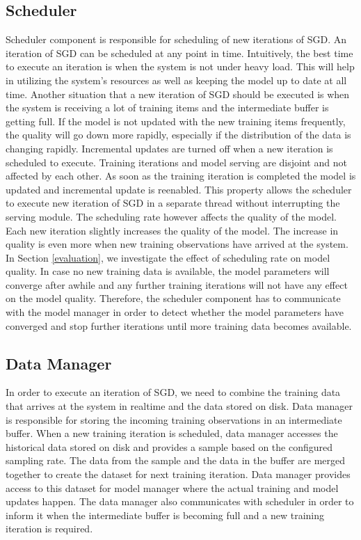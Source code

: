 \documentclass{sig-alternate-05-2015}
\begin{document}
\subsection{Scheduler}\label{scheduler}
Scheduler component is responsible for scheduling of new iterations of SGD.
An iteration of SGD can be scheduled at any point in time.
Intuitively, the best time to execute an iteration is when the system is not under heavy load.
This will help in utilizing the system's resources as well as keeping the model up to date at all time.
Another situation that a new iteration of SGD should be executed is when the system is receiving a lot of training items and the intermediate buffer is getting full.
If the model is not updated with the new training items frequently, the quality will go down more rapidly, especially if the distribution of the data is changing rapidly.
Incremental updates are turned off when a new iteration is scheduled to execute.
Training iterations and model serving are disjoint and not affected by each other.
As soon as the training iteration is completed the model is updated and incremental update is reenabled. 
This property allows the scheduler to execute new iteration of SGD in a separate thread without interrupting the serving module.
The scheduling rate however affects the quality of the model.
Each new iteration slightly increases the quality of the model.
The increase in quality is even more when new training observations have arrived at the system.
In Section \ref{evaluation}, we investigate the effect of scheduling rate on model quality.
In case no new training data is available, the model parameters will converge after awhile and any further training iterations will not have any effect on the model quality.
Therefore, the scheduler component has to communicate with the model manager in order to detect whether the model parameters have converged and stop further iterations until more training data becomes available.


\subsection{Data Manager} \label{data-manager}
In order to execute an iteration of SGD, we need to combine the training data that arrives at the system in realtime and the data stored on disk.
Data manager is responsible for storing the incoming training observations in an intermediate buffer.
When a new training iteration is scheduled, data manager accesses the historical data stored on disk and provides a sample based on the configured sampling rate.
The data from the sample and the data in the buffer are merged together to create the dataset for next training iteration.
Data manager provides access to this dataset for model manager where the actual training and model updates happen.
The data manager also communicates with scheduler in order to inform it when the intermediate buffer is becoming full and a new training iteration is required. 
\end{document}
